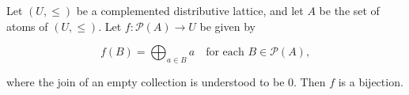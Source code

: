 Let $(U, \leq)$ be a complemented distributive lattice, and let $A$ be the set of atoms of $(U, \leq)$. Let $f: \mathcal{P}(A) \rightarrow U$ be given by

$$f(B) = \bigoplus_{a \in B} a \quad \text{for each } B \in \mathcal{P}(A),$$

where the join of an empty collection is understood to be 0. Then $f$ is a bijection.
